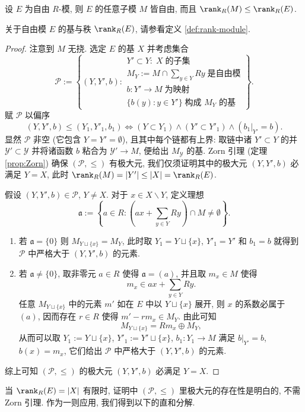 \begin{lemma}\label{prop:PID-free-submodule}
	设 $E$ 为自由 $R$-模, 则 $E$ 的任意子模 $M$ 皆自由, 而且 $\rank_R(M) \leq \rank_R(E)$. 
\end{lemma}
关于自由模 $E$ 的基与秩 $\rank_R(E)$, 请参看定义 \ref{def:rank-module}.
\begin{proof}
	注意到 $M$ 无挠. 选定 $E$ 的基 $X$ 并考虑集合
	\[ \mathcal{P} := \left\{ (Y,Y',b) :
		\begin{array}{l}
			Y' \subset Y: \; X\;\text{的子集} \\
			M_Y := M \cap \sum_{y \in Y} Ry \; \text{是自由模} \\
			b: Y' \to M \; \text{为映射} \\
			\{b(y) : y \in Y'\} \;\text{构成 $M_Y$ 的基}
		\end{array}
	\right\}. \]
	赋 $\mathcal{P}$ 以偏序
	\[ (Y, Y', b) \leq (Y_1, Y'_1, b_1) \iff (Y \subset Y_1) \wedge (Y' \subset Y'_1) \wedge (b_1|_{Y'} = b). \]
	显然 $\mathcal{P}$ 非空 (它包含 $Y=Y'=\emptyset$), 且其中每个链都有上界: 取链中诸 $Y' \subset Y$ 的并 $\mathcal{Y}' \subset \mathcal{Y}$ 并将诸函数 $b$ 粘合为 $\mathcal{Y}' \to M$, 便给出 $M_{\mathcal{Y}}$ 的基. Zorn 引理 (定理 \ref{prop:Zorn}) 确保 $(\mathcal{P}, \leq)$ 有极大元, 我们仅须证明其中的极大元 $(Y,Y',b)$ 必满足 $Y=X$, 此时 $\rank_R(M) = |Y'| \leq |X| = \rank_R(E)$.

	假设 $(Y,Y',b) \in \mathcal{P}$, $Y \neq X$. 对于 $x \in X \smallsetminus Y$, 定义理想
	\[ \mathfrak{a} := \left\{a \in R : \left( ax + \sum_{y \in Y} Ry \right) \cap M \neq \emptyset \right\}. \]
	\begin{enumerate}
		\item 若 $\mathfrak{a}=\{0\}$ 则 $M_{Y \sqcup \{x\}} = M_Y$, 此时取 $Y_1 = Y \sqcup \{x\}$, $Y'_1 = Y'$ 和 $b_1 = b$ 就得到 $\mathcal{P}$ 中严格大于 $(Y,Y',b)$ 的元素.
		\item 若 $\mathfrak{a} \neq \{0\}$, 取非零元 $a \in R$ 使得 $\mathfrak{a} = (a)$, 并且取 $m_x \in M$ 使得
			\[ m_x \in ax + \sum_{y \in Y} Ry. \]
			任意 $M_{Y \sqcup \{x\}}$ 中的元素 $m'$ 如在 $E$ 中以 $Y \sqcup \{x\}$ 展开, 则 $x$ 的系数必属于 $(a)$, 因而存在 $r \in R$ 使得 $m' - rm_x \in M_Y$. 由此可知
			\[ M_{Y \sqcup \{x\}} = Rm_x \oplus M_Y, \]
		从而可以取 $Y_1 := Y \sqcup \{x\}$, $Y'_1 := Y' \sqcup \{x\}$, $b_1: Y_1 \to M$ 满足 $b|_{Y'}=b$, $b(x) = m_x$, 它们给出 $\mathcal{P}$ 中严格大于 $(Y,Y',b)$ 的元素.
	\end{enumerate}
	综上可知 $(\mathcal{P}, \leq)$ 的极大元 $(Y,Y',b)$ 必满足 $Y=X$.
\end{proof}
当 $\rank_R(E) = |X|$ 有限时, 证明中 $(\mathcal{P}, \leq)$ 里极大元的存在性是明白的, 不需 Zorn 引理. 作为一则应用, 我们得到以下的直和分解.

